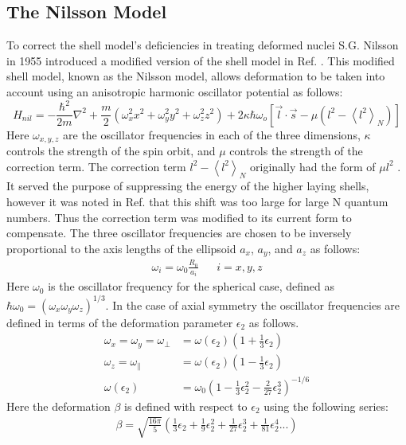 \subsection{The Nilsson Model}
To correct the shell model's deficiencies in treating deformed nuclei S.G. Nilsson in 1955 introduced a modified version of the shell model in Ref. \cite{nilsson}. This modified shell model, known as the Nilsson model, allows deformation to be taken into account using an anisotropic harmonic oscillator potential as follows:
\begin{equation}
\label{eqn:chp2-nilsson-hamil}
H_{nil}=-\frac{\hbar^{2}}{2m}\nabla^{2} + \frac{m}{2}\left(\omega_{x}^{2}x^{2} + \omega_{y}^{2}y^{2} + \omega_{z}^{2}z^{2}\right) + 2\kappa \hbar \omega_{o}\left[\vec{l}\cdot \vec{s} - \mu \left(l^{2} - \left \langle l^{2} \right \rangle_{N} \right) \right]
\end{equation} 
Here $\omega_{x,y,z}$ are the oscillator frequencies in each of the three dimensions, $\kappa$ controls the strength of the spin orbit, and $\mu$ controls the strength of the correction term. The correction term $l^2 - \left \langle l^{2} \right \rangle_{N}$ originally had the form of $\mu l^2$ \cite{nilsson}. It served the purpose of suppressing the energy of the higher laying shells, however it was noted in Ref. \cite{nilssonCorrection} that this shift was too large for large N quantum numbers. Thus the correction term was modified to its current form to compensate. The three oscillator frequencies are chosen to be inversely proportional to the axis lengths of the ellipsoid $a_x$, $a_y$, and $a_z$ as follows:
\begin{align}
\label{eqn:chp2-nilsson-oscilator-freq}
\omega_i = \omega_0\frac{R_0}{a_i} &  & i=x,y,z
\end{align}
Here $\omega_0$ is the oscillator frequency for the spherical case, defined as $\hbar\omega_0 = (\omega_x \omega_y \omega_z )^{1/3}$. In the case of axial symmetry the oscillator frequencies are defined in terms of the deformation parameter $\epsilon_2$ as follows.
\begin{align}
\label{eqn:chp2-nilsson-oscilator-freq-components}
\omega_{x}=\omega_{y}=\omega_{\bot}&=\omega(\epsilon_2)\left(1+\frac{1}{3}\epsilon_2 \right)\\
\omega_{z}=\omega_{\parallel}&=\omega(\epsilon_2)\left(1-\frac{1}{3}\epsilon_2 \right)\\
\omega(\epsilon_2) &= \omega_0\left(1-\frac{1}{3}\epsilon_2^2-\frac{2}{27}\epsilon_2^3\right)^{-1/6}
\end{align}
Here the deformation $\beta$ is defined with respect to $\epsilon_2$ using the following series:
\begin{align}
\label{eqn:chp2-nilsson-beta-from-epsilon}
\beta = \sqrt{\frac{16 \pi}{5}}\left( \frac{1}{3}\epsilon_2 + \frac{1}{9}\epsilon_2^2 + \frac{1}{27}\epsilon_2^3 +  \frac{1}{81}\epsilon_2^4...\right)
\end{align}

